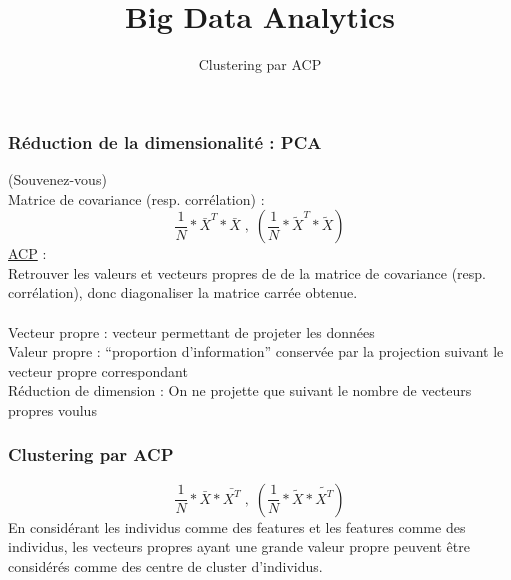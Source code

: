 \documentclass{formation}
\title{Big Data Analytics}
\subtitle{Clustering par ACP}
\begin{document}
\maketitle

\begin{frame}
  \frametitle{Réduction de la dimensionalité : PCA}
  (Souvenez-vous) \\
  Matrice de covariance (resp. corrélation) :
  \[
  \frac{1}{N} * \bar{X}^T * \bar{X} \;,\;( \frac{1}{N} * \tilde{X}^T * \tilde{X} )
  \]
  \underline{ACP} : \\
  Retrouver les valeurs et vecteurs propres de de la matrice de covariance (resp. corrélation), donc diagonaliser la matrice carrée obtenue. \\
  \\
  Vecteur propre : vecteur permettant de projeter les données \\
  Valeur propre : ``proportion d'information'' conservée par la projection suivant le vecteur propre correspondant \\
  Réduction de dimension : On ne projette que suivant le nombre de vecteurs propres voulus
\end{frame}

\begin{frame}
  \frametitle{Clustering par ACP}
    \[
  \frac{1}{N} * \bar{X} * \bar{X^T} \;,\;( \frac{1}{N} * \tilde{X} * \tilde{X^T} )
  \]
  En considérant les individus comme des features et les features comme des individus, les vecteurs propres ayant une grande valeur propre peuvent être considérés comme des centre de cluster d'individus.
\end{frame}
\end{document}

